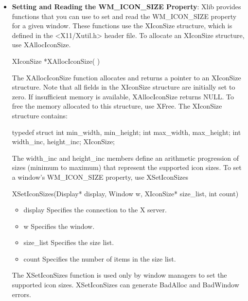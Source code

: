 \documentclass{report}
\begin{document}
\begin{itemize}
\begin{itemize}
            \bigbreak \noindent 
            XGetWMColormapWindows can generate a BadWindow error.
        \item \textbf{Setting and Reading the WM\_ICON\_SIZE Property}: Xlib provides functions that you can use to set and read the WM_ICON_SIZE property for a given window. These functions use the XIconSize structure, which is defined in the <X11/Xutil.h> header file.
            \bigbreak \noindent 
            To allocate an XIconSize structure, use XAllocIconSize.
            \bigbreak \noindent 
            \begin{cppcode}
            XIconSize *XAllocIconSize( )
            \end{cppcode}
            \bigbreak \noindent 
            The XAllocIconSize function allocates and returns a pointer to an XIconSize structure. Note that all fields in the XIconSize structure are initially set to zero. If insufficient memory is available, XAllocIconSize returns NULL. To free the memory allocated to this structure, use XFree.
            \bigbreak \noindent 
            The XIconSize structure contains:
            \bigbreak \noindent 
            \begin{cppcode}
            typedef struct {
                int min_width, min_height;
                int max_width, max_height;
                int width_inc, height_inc;
            } XIconSize;
            \end{cppcode}
            \bigbreak \noindent 
            The width\_inc and height\_inc members define an arithmetic progression of sizes (minimum to maximum) that represent the supported icon sizes.
            \bigbreak \noindent 
            To set a window’s WM\_ICON\_SIZE property, use XSetIconSizes
            \bigbreak \noindent 
            \begin{cppcode}
                XSetIconSizes(Display* display, Window w, XIconSize* size_list, int count)
            \end{cppcode}
            \begin{itemize}
                \item display Specifies the connection to the X server.
                \item w Specifies the window.
                \item size\_list Specifies the size list.
                \item count Specifies the number of items in the size list.
            \end{itemize}
            The XSetIconSizes function is used only by window managers to set the supported icon sizes. XSetIconSizes can generate BadAlloc and BadWindow errors.

\end{itemize}
\end{itemize}
\end{document}
